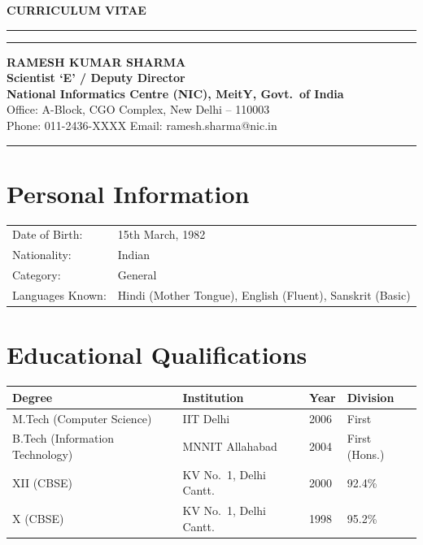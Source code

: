 \documentclass[12pt,letterpaper]{article}
\begin{document}
\begin{center}
\textbf{\Large CURRICULUM VITAE}\\[12pt]
\hrule\vspace{2pt}\hrule
\vspace{10pt}
\textbf{\large RAMESH KUMAR SHARMA}\\[4pt]
\textbf{Scientist `E' / Deputy Director}\\
\textbf{National Informatics Centre (NIC), MeitY, Govt.\ of India}\\[6pt]
{\small Office: A-Block, CGO Complex, New Delhi -- 110003}\\
{\small Phone: 011-2436-XXXX \quad Email: ramesh.sharma@nic.in}\\
\end{center}

\vspace{6pt}
\hrule

\section{Personal Information}
\begin{longtable}{@{}p{4cm}p{10cm}@{}}
Date of Birth: & 15th March, 1982\\
Nationality: & Indian\\
Category: & General\\
Languages Known: & Hindi (Mother Tongue), English (Fluent), Sanskrit (Basic)\\
\end{longtable}

\section{Educational Qualifications}
\begin{longtable}{@{}|p{5cm}|p{4cm}|p{2cm}|p{2cm}|@{}}
\hline
\textbf{Degree} & \textbf{Institution} & \textbf{Year} & \textbf{Division}\\
\hline
M.Tech (Computer Science) & IIT Delhi & 2006 & First\\
\hline
B.Tech (Information Technology) & MNNIT Allahabad & 2004 & First (Hons.)\\
\hline
XII (CBSE) & KV No.\ 1, Delhi Cantt. & 2000 & 92.4\%\\
\hline
X (CBSE) & KV No.\ 1, Delhi Cantt. & 1998 & 95.2\%\\
\hline
\end{longtable}
\end{document}
